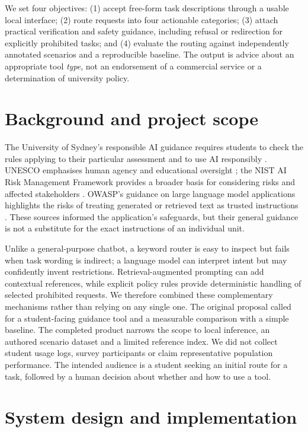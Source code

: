 \documentclass[11pt,a4paper]{article}
\begin{document}
We set four objectives: (1) accept free-form task descriptions through a usable local interface; (2) route requests into four actionable categories; (3) attach practical verification and safety guidance, including refusal or redirection for explicitly prohibited tasks; and (4) evaluate the routing against independently annotated scenarios and a reproducible baseline. The output is advice about an appropriate tool \emph{type}, not an endorsement of a commercial service or a determination of university policy.

\section{Background and project scope}
The University of Sydney's responsible AI guidance requires students to check the rules applying to their particular assessment and to use AI responsibly \cite{usyd}. UNESCO emphasises human agency and educational oversight \cite{unesco}; the NIST AI Risk Management Framework provides a broader basis for considering risks and affected stakeholders \cite{nist}. OWASP's guidance on large language model applications highlights the risks of treating generated or retrieved text as trusted instructions \cite{owasp}. These sources informed the application's safeguards, but their general guidance is not a substitute for the exact instructions of an individual unit.

Unlike a general-purpose chatbot, a keyword router is easy to inspect but fails when task wording is indirect; a language model can interpret intent but may confidently invent restrictions. Retrieval-augmented prompting can add contextual references, while explicit policy rules provide deterministic handling of selected prohibited requests. We therefore combined these complementary mechanisms rather than relying on any single one. The original proposal called for a student-facing guidance tool and a measurable comparison with a simple baseline. The completed product narrows the scope to local inference, an authored scenario dataset and a limited reference index. We did not collect student usage logs, survey participants or claim representative population performance. The intended audience is a student seeking an initial route for a task, followed by a human decision about whether and how to use a tool.

\section{System design and implementation}
\end{document}
